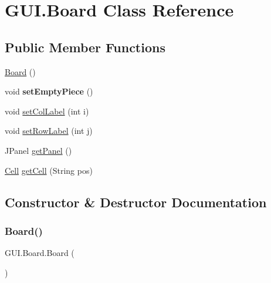 \hypertarget{class_g_u_i_1_1_board}{}\section{G\+U\+I.\+Board Class Reference}
\label{class_g_u_i_1_1_board}
\subsection*{Public Member Functions}
\begin{DoxyCompactItemize}
\item 
\mbox{\hyperlink{class_g_u_i_1_1_board_a5384facfb30f8859954c94938e13f7b8}{Board}} ()
\item 
\mbox{\label{class_g_u_i_1_1_board_afae183402f9dfc9f4e17983f283fdae9}} 
void {\bfseries set\+Empty\+Piece} ()
\item 
void \mbox{\hyperlink{class_g_u_i_1_1_board_a5c731ea8c55eb03fbe3957b6780d2d99}{set\+Col\+Label}} (int i)
\item 
void \mbox{\hyperlink{class_g_u_i_1_1_board_a9536cdbbbc77d61a9b9cede722578ad1}{set\+Row\+Label}} (int j)
\item 
J\+Panel \mbox{\hyperlink{class_g_u_i_1_1_board_a5687d06b1a3a957953d4b63ec2a69806}{get\+Panel}} ()
\item 
\mbox{\hyperlink{class_g_u_i_1_1_cell}{Cell}} \mbox{\hyperlink{class_g_u_i_1_1_board_a2eae485591977a602b2f1eb67fa1718e}{get\+Cell}} (String pos)
\end{DoxyCompactItemize}


\subsection{Constructor \& Destructor Documentation}
\mbox{\label{class_g_u_i_1_1_board_a5384facfb30f8859954c94938e13f7b8}} 
\subsubsection{\texorpdfstring{Board()}{Board()}}
{\footnotesize\ttfamily G\+U\+I.\+Board.\+Board (\begin{DoxyParamCaption}{ }\end{DoxyParamCaption})\hspace{0.3cm}{\ttfamily [inline]}}

